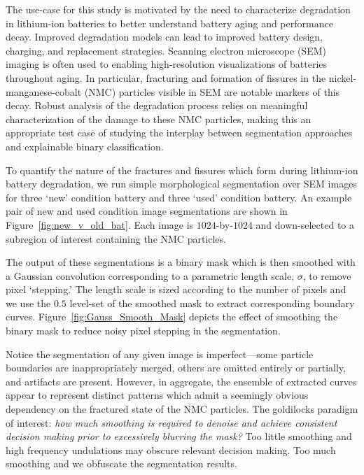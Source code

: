\documentclass[pdflatex,iicol]{sn-jnl}%
\theoremstyle{thmstyleone}%
\theoremstyle{thmstyletwo}%
\theoremstyle{thmstylethree}%
\begin{document}
The use-case for this study is motivated by the need to characterize degradation in lithium-ion batteries to better understand battery aging and performance decay. Improved degradation models can lead to improved battery design, charging, and replacement strategies. Scanning electron microscope (SEM) imaging is often used to enabling high-resolution visualizations of batteries throughout aging. In particular, fracturing and formation of fissures in the nickel-manganese-cobalt (NMC) particles visible in SEM are notable markers of this decay. Robust analysis of the degradation process relies on meaningful characterization of the damage to these NMC particles, making this an appropriate test case of studying the interplay between segmentation approaches and explainable binary classification.

To quantify the nature of the fractures and fissures which form during lithium-ion battery degradation, we run simple morphological segmentation over SEM images for three `new' condition battery and three `used' condition battery. An example pair of new and used condition image segmentations are shown in Figure~\ref{fig:new_v_old_bat}. Each image is $1024$-by-$1024$ and down-selected to a subregion of interest containing the NMC particles.

The output of these segmentations is a binary mask which is then smoothed with a Gaussian convolution corresponding to a parametric length scale, $\sigma$, to remove pixel `stepping.' The length scale is sized according to the number of pixels and we use the $0.5$ level-set of the smoothed mask to extract corresponding boundary curves. Figure~\ref{fig:Gauss_Smooth_Mask} depicts the effect of smoothing the binary mask to reduce noisy pixel stepping in the segmentation.

Notice the segmentation of any given image is imperfect---some particle boundaries are inappropriately merged, others are omitted entirely or partially, and artifacts are present. However, in aggregate, the ensemble of extracted curves appear to represent distinct patterns which admit a seemingly obvious dependency on the fractured state of the NMC particles. The goldilocks paradigm of interest: \textit{how much smoothing is required to denoise and achieve consistent decision making prior to excessively blurring the mask?} Too little smoothing and high frequency undulations may obscure relevant decision making. Too much smoothing and we obfuscate the segmentation results.
\end{document}
